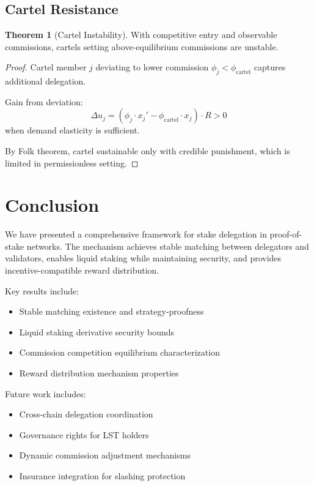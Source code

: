 \documentclass[11pt,a4paper]{article}
\theoremstyle{definition}
\newtheorem{theorem}{Theorem}[section]
\theoremstyle{remark}
\begin{document}
\subsection{Cartel Resistance}

\begin{theorem}[Cartel Instability]
With competitive entry and observable commissions, cartels setting above-equilibrium commissions are unstable.
\end{theorem}

\begin{proof}
Cartel member $j$ deviating to lower commission $\phi_j < \phi_{\text{cartel}}$ captures additional delegation.

Gain from deviation:
\begin{equation}
    \Delta u_j = (\phi_j \cdot x_j' - \phi_{\text{cartel}} \cdot x_j) \cdot R > 0
\end{equation}
when demand elasticity is sufficient.

By Folk theorem, cartel sustainable only with credible punishment, which is limited in permissionless setting.
\end{proof}

\section{Conclusion}

We have presented a comprehensive framework for stake delegation in proof-of-stake networks. The mechanism achieves stable matching between delegators and validators, enables liquid staking while maintaining security, and provides incentive-compatible reward distribution.

Key results include:
\begin{itemize}
    \item Stable matching existence and strategy-proofness
    \item Liquid staking derivative security bounds
    \item Commission competition equilibrium characterization
    \item Reward distribution mechanism properties
\end{itemize}

Future work includes:
\begin{itemize}
    \item Cross-chain delegation coordination
    \item Governance rights for LST holders
    \item Dynamic commission adjustment mechanisms
    \item Insurance integration for slashing protection
\end{itemize}
\end{document}

